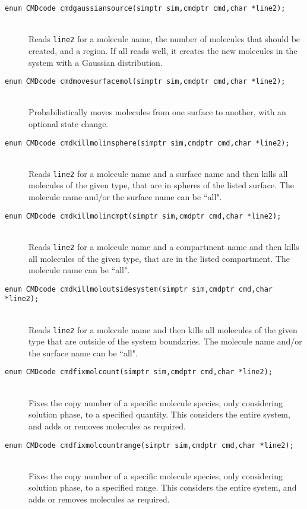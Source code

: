 \documentclass {scrbook}
\newcommand {\ttt} {\texttt}
\begin{document}
\begin{description}
\item[\ttt{enum CMDcode cmdgaussiansource(simptr sim,cmdptr cmd,char *line2);}]
\hfill \\
Reads \ttt{line2} for a molecule name, the number of molecules that should be created, and a region. If all reads well, it creates the new molecules in the system with a Gaussian distribution.

\item[\ttt{enum CMDcode cmdmovesurfacemol(simptr sim,cmdptr cmd,char *line2);}]
\hfill \\
Probabilistically moves molecules from one surface to another, with an optional state change.

\item[\ttt{enum CMDcode cmdkillmolinsphere(simptr sim,cmdptr cmd,char *line2);}]
\hfill \\
Reads \ttt{line2} for a molecule name and a surface name and then kills all molecules of the given type, that are in spheres of the listed surface. The molecule name and/or the surface name can be ``all".

\item[\ttt{enum CMDcode cmdkillmolincmpt(simptr sim,cmdptr cmd,char *line2);}]
\hfill \\
Reads \ttt{line2} for a molecule name and a compartment name and then kills all molecules of the given type, that are in the listed compartment. The molecule name can be ``all".

\item[\ttt{enum CMDcode cmdkillmoloutsidesystem(simptr sim,cmdptr cmd,char *line2);}]
\hfill \\
Reads \ttt{line2} for a molecule name and then kills all molecules of the given type that are outside of the system boundaries. The molecule name and/or the surface name can be ``all".

\item[\ttt{enum CMDcode cmdfixmolcount(simptr sim,cmdptr cmd,char *line2);}]
\hfill \\
Fixes the copy number of a specific molecule species, only considering solution phase, to a specified quantity. This considers the entire system, and adds or removes molecules as required.

\item[\ttt{enum CMDcode cmdfixmolcountrange(simptr sim,cmdptr cmd,char *line2);}]
\hfill \\
Fixes the copy number of a specific molecule species, only considering solution phase, to a specified range. This considers the entire system, and adds or removes molecules as required.


\end{description}
\end{document}
